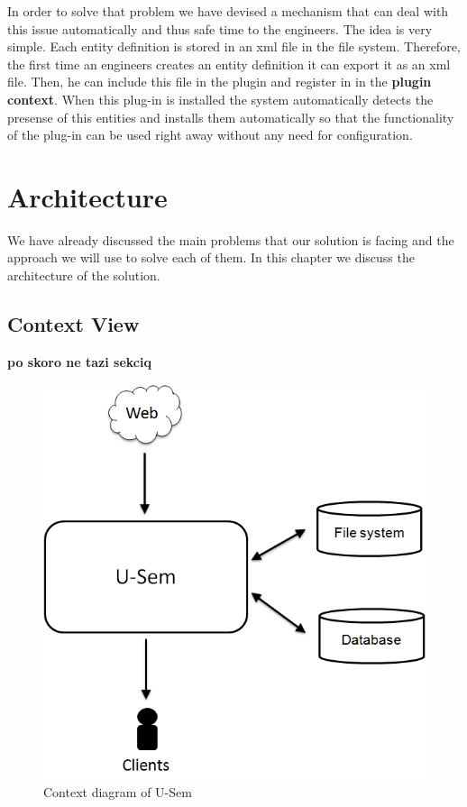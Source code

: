 \documentclass[a4paper, notitlepage]{article}
\begin{document}
In order to solve that problem we have devised a mechanism that can deal with this issue automatically and thus safe time to the engineers. The idea is very simple. Each entity definition is stored in an xml file in the file system. Therefore, the first time an engineers creates an entity definition it can export it as an xml file. Then, he can include this file in the plugin and register in in the \textbf{plugin context}. When this plug-in is installed the system automatically detects the presense of this entities and installs them automatically so that the functionality of the plug-in can be used right away without any need for configuration.

\section{Architecture}
We have already discussed the main problems that our solution is facing and the approach we will use to solve each of them. In this chapter we discuss the architecture of the solution.

\subsection{Context View}
\textbf{po skoro ne tazi sekciq}
\begin{figure}[h!]
  \centering
  	\includegraphics[scale=0.4]{environment/runtime_environment_storage.png}
  \caption{Context diagram of U-Sem }
  \label{fig_context}
\end{figure}
\end{document}
